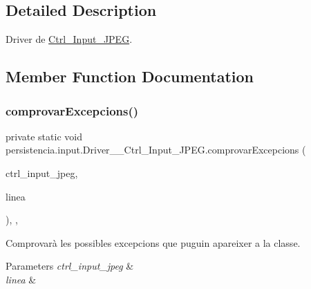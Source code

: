 \subsection{Detailed Description}
Driver de \hyperlink{classpersistencia_1_1input_1_1Ctrl__Input__JPEG}{Ctrl\+\_\+\+Input\+\_\+\+J\+P\+EG}. 

\subsection{Member Function Documentation}
\mbox{\label{classpersistencia_1_1input_1_1Driver____Ctrl__Input__JPEG_ad40099d3188e58f93a2a57c4277b754e}} 
\subsubsection{\texorpdfstring{comprovar\+Excepcions()}{comprovarExcepcions()}}
{\footnotesize\ttfamily private static void persistencia.\+input.\+Driver\+\_\+\+\_\+\+Ctrl\+\_\+\+Input\+\_\+\+J\+P\+E\+G.\+comprovar\+Excepcions (\begin{DoxyParamCaption}\item[{\hyperlink{classpersistencia_1_1input_1_1Ctrl__Input__JPEG}{Ctrl\+\_\+\+Input\+\_\+\+J\+P\+EG}}]{ctrl\+\_\+input\+\_\+jpeg,  }\item[{String}]{linea }\end{DoxyParamCaption})\hspace{0.3cm}{\ttfamily [inline]}, {\ttfamily [static]}, {\ttfamily [private]}}



Comprovarà les possibles excepcions que puguin apareixer a la classe. 


\begin{DoxyParams}{Parameters}
{\em ctrl\+\_\+input\+\_\+jpeg} & \\
\hline
{\em linea} & \\
\hline
\end{DoxyParams}

